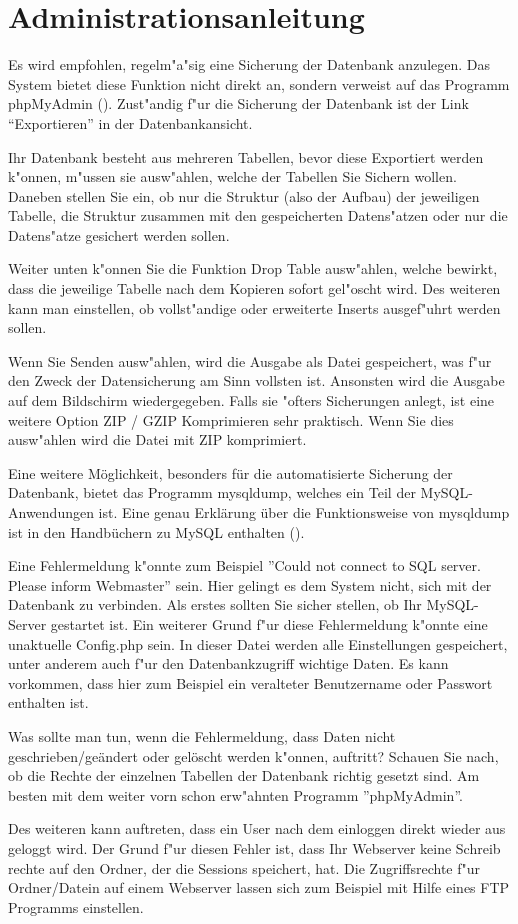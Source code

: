 \section{Administrationsanleitung}


Es wird empfohlen, regelm"a"sig eine Sicherung der Datenbank anzulegen. Das System bietet diese Funktion nicht direkt an,
sondern verweist auf das Programm phpMyAdmin (). Zust"andig f"ur die Sicherung der Datenbank ist der Link ``Exportieren'' in der Datenbankansicht.


Ihr Datenbank besteht aus mehreren Tabellen, bevor diese Exportiert werden k"onnen, m"ussen sie ausw"ahlen, welche der Tabellen Sie Sichern wollen. 
Daneben stellen Sie ein, ob nur die Struktur 
(also der Aufbau) der jeweiligen Tabelle, die Struktur zusammen mit den gespeicherten Datens"atzen oder nur die Datens"atze gesichert werden sollen.

Weiter unten k"onnen Sie die Funktion Drop Table ausw"ahlen, welche bewirkt, dass die jeweilige Tabelle nach dem Kopieren sofort gel"oscht wird. Des weiteren 
kann man einstellen, ob vollst"andige oder erweiterte Inserts ausgef"uhrt werden sollen.  

Wenn Sie Senden ausw"ahlen, wird die Ausgabe als Datei gespeichert, was f"ur den Zweck der Datensicherung am Sinn vollsten ist. Ansonsten wird die 
Ausgabe auf dem Bildschirm wiedergegeben. 
Falls sie "ofters Sicherungen anlegt, ist eine weitere Option ZIP / GZIP Komprimieren sehr praktisch. Wenn Sie dies ausw"ahlen wird die Datei mit ZIP 
komprimiert.

Eine weitere Möglichkeit, besonders für die automatisierte Sicherung der Datenbank, bietet das Programm mysqldump, welches ein Teil der MySQL-Anwendungen ist. Eine genau Erklärung über die Funktionsweise von mysqldump ist in den Handbüchern zu MySQL enthalten ().


Eine Fehlermeldung k"onnte zum Beispiel ''Could not connect to SQL server. Please inform Webmaster'' sein. Hier gelingt es dem System nicht, sich mit 
der Datenbank zu verbinden. Als erstes sollten Sie sicher stellen, ob Ihr MySQL-Server gestartet ist. Ein weiterer Grund f"ur diese Fehlermeldung k"onnte 
eine unaktuelle Config.php sein. In dieser Datei werden alle Einstellungen gespeichert, unter anderem auch f"ur den Datenbankzugriff wichtige Daten. Es 
kann vorkommen, dass hier zum Beispiel ein veralteter Benutzername oder Passwort enthalten ist.

Was sollte man tun, wenn die Fehlermeldung, dass Daten nicht geschrieben/geändert oder gelöscht werden k"onnen, auftritt? Schauen Sie nach, ob die Rechte 
der einzelnen Tabellen der Datenbank richtig gesetzt sind. Am besten mit dem weiter vorn schon erw"ahnten Programm ''phpMyAdmin''.

Des weiteren kann auftreten, dass ein User nach dem einloggen direkt wieder aus geloggt wird. Der Grund f"ur diesen Fehler ist, dass Ihr Webserver keine 
Schreib rechte auf den Ordner, der die Sessions speichert, hat. Die Zugriffsrechte f"ur Ordner/Datein auf einem Webserver lassen sich zum Beispiel 
mit Hilfe eines FTP Programms einstellen. 